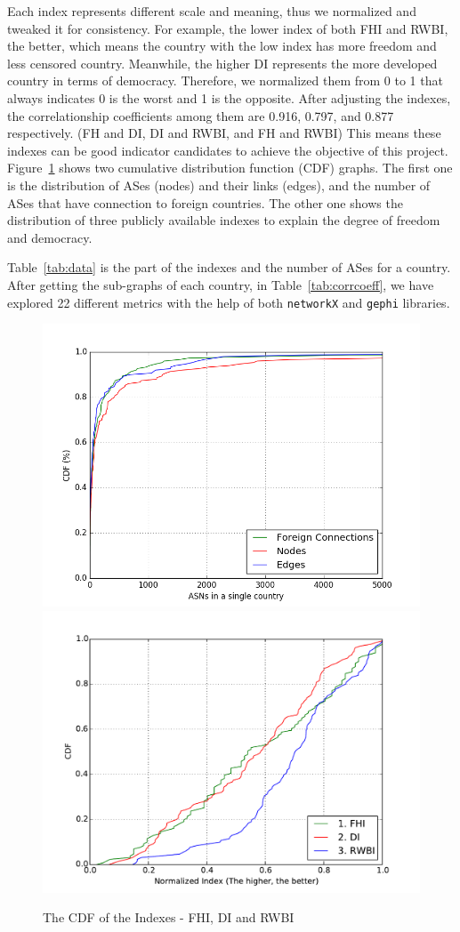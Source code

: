 \documentclass{article}
\begin{document}
\noindent 
Each index represents different scale and meaning, thus we normalized and
tweaked it for consistency. For example, the lower index of both FHI and RWBI,
the better, which means the country with the low index has more freedom and less
censored country. Meanwhile, the higher DI represents the more developed country
in terms of democracy. Therefore, we normalized them from 0 to 1 that always
indicates 0 is the worst and 1 is the opposite. After adjusting the indexes, the
correlationship coefficients among them are 0.916, 0.797, and 0.877
respectively. (FH and DI, DI and RWBI, and FH and RWBI) This means these indexes
can be good indicator candidates to achieve the objective of this project.
Figure~\ref{fig:index_cdf} shows two cumulative distribution function (CDF) graphs. 
The first one is the distribution of ASes (nodes) and their links (edges), and the number
of ASes that have connection to foreign countries. The other one shows the distribution
of three publicly available indexes to explain the degree of freedom and democracy.

\bigskip

\noindent
Table~\ref{tab:data} is the part of the indexes and the number of ASes for a 
country.  After getting the sub-graphs of each country, in Table~\ref{tab:corrcoeff},
we have explored 22 different metrics with the help of both \texttt{networkX} and 
\texttt{gephi} libraries.

\begin{figure}[h]
\centering 
\includegraphics[width=0.8\columnwidth]{node_edge_foreign.png}
\includegraphics[width=0.8\columnwidth]{index_cdf.pdf}
\caption{The CDF of the Indexes - FHI, DI and RWBI}
\label{fig:index_cdf}
\end{figure}
\end{document}
